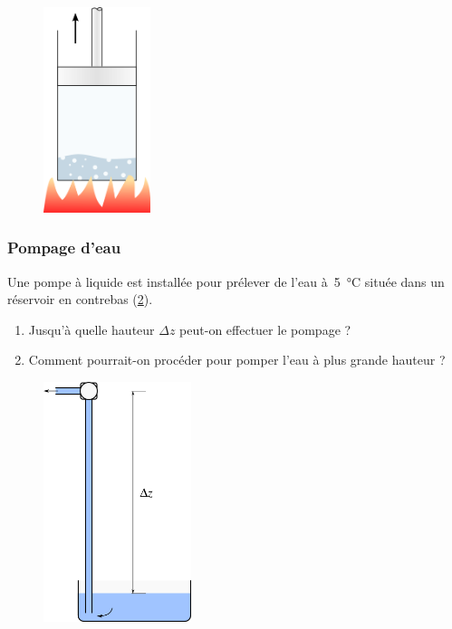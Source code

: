 	\begin{figure}[htp] %
		\begin{center}
			\includegraphics[height=6cm]{images/exercice_moteur_simple.png}
		\end{center}
		\label{fig_moteurvapeursimple}
	\end{figure}


\subsubsection{Pompage d’eau}
\label{exo_pompage_baliani}

	Une pompe à liquide est installée pour prélever de l’eau à~\SI{5}{\degreeCelsius} située dans un réservoir en contrebas (\cref{fig_pompage}).
	
	\begin{enumerate}
		\item Jusqu’à quelle hauteur $\Delta z$ peut-on effectuer le pompage ?	
		\item Comment pourrait-on procéder pour pomper l’eau à plus grande hauteur ?
	\end{enumerate}

	\begin{figure}[htp] %
		\begin{center}
			\includegraphics[height=7cm]{images/exercice_pompe_eau.png}
		\end{center}
		\label{fig_pompage}
	\end{figure}



